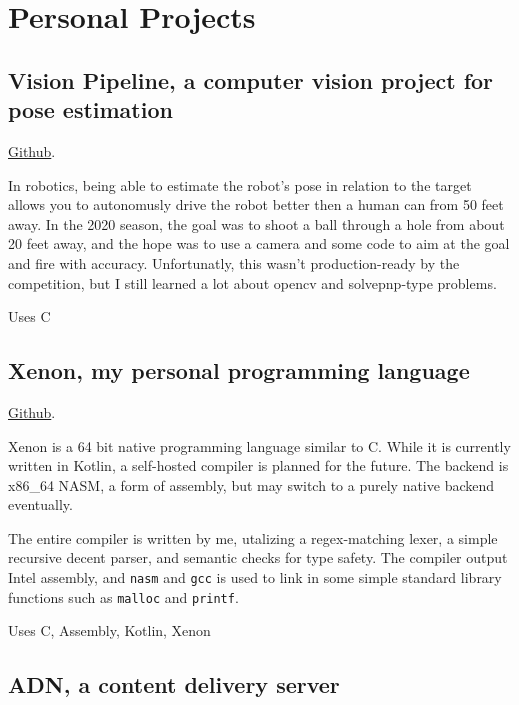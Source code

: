 \documentclass[10pt,letterpaper]{article}
\newcommand{\CPP}
{C\nolinebreak[4]\hspace{-.05em}\raisebox{.35ex}{\footnotesize\bf ++}}
\def\code#1{\texttt{#1}}
\begin{document}
    \section*{Personal Projects}

    \subsection*{Vision Pipeline, a computer vision project for pose estimation}
    \href{https://github.com/CougarProgramming623/vision-pipeline}{Github}. 
    
    In robotics, being able to estimate the robot's pose in relation to the target
    allows you to autonomusly drive the robot better then a human can from 50 feet away.
    In the 2020 season, the goal was to shoot a ball through a hole from about 20 feet away,
    and the hope was to use a camera and some code to aim at the goal and fire with accuracy.
    Unfortunatly, this wasn't production-ready by the competition,
    but I still learned a lot about opencv and solvepnp-type problems. 

    \vspace{0.5em}
    \noindent Uses \CPP
    
    
    \subsection*{Xenon, my personal programming language}
    \href{https://github.com/Mee42/Xenon}{Github}.
    
    Xenon is a 64 bit native programming language similar to C.
    While it is currently written in Kotlin, a self-hosted compiler is planned for the future.
    The backend is x86\_64 NASM, a form of assembly,
    but may switch to a purely native backend eventually.
    
    The entire compiler is written by me, utalizing a regex-matching lexer, 
    a simple recursive decent parser,
    and semantic checks for type safety.
    The compiler output Intel assembly,
    and \code{nasm} and \code{gcc} is used to link in some simple standard library functions such as
    \code{malloc} and \code{printf}.
    
    \vspace{0.5em}
    \noindent Uses C, Assembly, Kotlin, Xenon

    \subsection*{ADN, a content delivery server}
    
\end{document}
